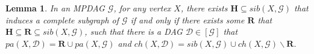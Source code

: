 \documentclass{article}
\newtheorem{lemma}[theorem]{Lemma}
\begin{document}
\begin{lemma}\label{lem: complex2simple}
In an MPDAG $\mathcal{G}$, for any vertex $X$, there exists $\mathbf{H} \subseteq{sib(X,\mathcal{G})}$ that induces a complete subgraph of $\mathcal{G}$ if and only if there exists some $\mathbf{R}$ that $\mathbf{H} \subseteq \mathbf{R} \subseteq{sib(X,\mathcal{G})}$, such that there is a DAG $\mathcal{D} \in [\mathcal{G}]$ that $pa(X,\mathcal{D})=\mathbf{R} \cup pa(X,\mathcal{G})$ and $ch(X,\mathcal{D})=sib(X,\mathcal{G}) \cup ch(X, \mathcal{G}) \backslash \mathbf{R}$.
\end{lemma}
\end{document}
